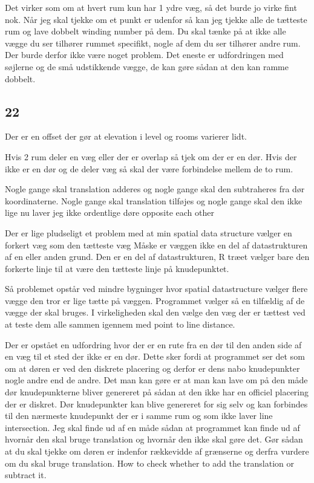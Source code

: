 Det virker som om at hvert rum kun har 1 ydre væg, så det burde jo virke fint nok. 
Når jeg skal tjekke om et punkt er udenfor så kan jeg tjekke alle de tætteste rum og lave dobbelt winding number på dem. Du skal tænke på at ikke alle vægge du ser tilhører rummet specifikt, nogle af dem du ser tilhører andre rum. Der burde derfor ikke være noget problem. Det eneste er udfordringen med søjlerne og de små udstikkende vægge, de kan gøre sådan at den kan ramme dobbelt.


\subsection{22}
Der er en offset der gør at elevation i level og rooms varierer lidt.

Hvis 2 rum deler en væg eller der er overlap så tjek om der er en dør. Hvis der ikke er en dør og de deler væg så skal der være forbindelse mellem de to rum.

Nogle gange skal translation adderes og nogle gange skal den subtraheres fra dør koordinaterne.
Nogle gange skal translation tilføjes og nogle gange skal den ikke
lige nu laver jeg ikke ordentlige døre opposite each other

Der er lige pludseligt et problem med at min spatial data structure vælger en forkert væg som den tætteste væg
Måske er væggen ikke en del af datastrukturen af en eller anden grund.
Den er en del af datastrukturen, R træet vælger bare den forkerte linje til at være den tætteste linje på knudepunktet.

Så problemet opstår ved mindre bygninger hvor spatial datastructure vælger flere vægge den tror er lige tætte på væggen. Programmet vælger så en tilfældig af de vægge der skal bruges. I virkeligheden skal den vælge den væg der er tættest ved at teste dem alle sammen igennem med point to line distance.

Der er opstået en udfordring hvor der er en rute fra en dør til den anden side af en væg til et sted der ikke er en dør. Dette sker fordi at programmet ser det som om at døren er ved den diskrete placering og derfor er dens nabo knudepunkter nogle andre end de andre.
Det man kan gøre er at man kan lave om på den måde dør knudepunkterne bliver genereret på sådan at den ikke har en officiel placering der er diskret. Dør knudepunkter kan blive genereret for sig selv og kan forbindes til den nærmeste knudepunkt der er i samme rum og som ikke laver line intersection.
Jeg skal finde ud af en måde sådan at programmet kan finde ud af hvornår den skal bruge translation og hvornår den ikke skal gøre det.
Gør sådan at du skal tjekke om døren er indenfor rækkevidde af grænserne og derfra vurdere om du skal bruge translation.
How to check whether to add the translation or subtract it.

